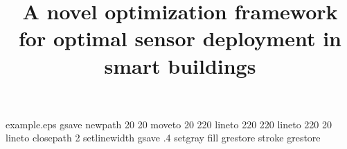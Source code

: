 %
%
%
%
%
\begin{filecontents*}{example.eps}
gsave
newpath
  20 20 moveto
  20 220 lineto
  220 220 lineto
  220 20 lineto
closepath
2 setlinewidth
gsave
  .4 setgray fill
grestore
stroke
grestore
\end{filecontents*}
%
\RequirePackage{fix-cm}
%
\documentclass{svjour3}                     %
%
\smartqed  %
%
\usepackage{graphicx}

\usepackage{diagbox}
\usepackage{multirow}
\usepackage{comment}
\usepackage{xcolor}
\usepackage{amsmath}
\usepackage{natbib}
\usepackage{breakcites}

\newcolumntype{P}[1]{>{\centering\arraybackslash}m{#1}}

\usepackage{setspace}
\doublespacing


%
%
%
%
%


\title{  A novel optimization framework for optimal sensor deployment in smart buildings }
  

